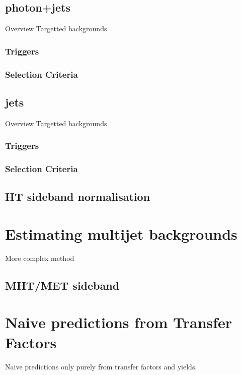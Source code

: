 \subsection{photon+jets}
Overview
Targetted backgrounds
\subsubsection{Triggers}
\subsubsection{Selection Criteria}

\subsection{jets}
Overview
Targetted backgrounds
\subsubsection{Triggers}
\subsubsection{Selection Criteria}

\subsection{HT sideband normalisation}

\section{Estimating multijet backgrounds}  %
\label{sec:background_qcd}
More complex method
\subsection{MHT/MET sideband}


\section{Naive predictions from Transfer Factors}  %
\label{sec:background_predictions}
Naive predictions only purely from transfer factors and yields.


